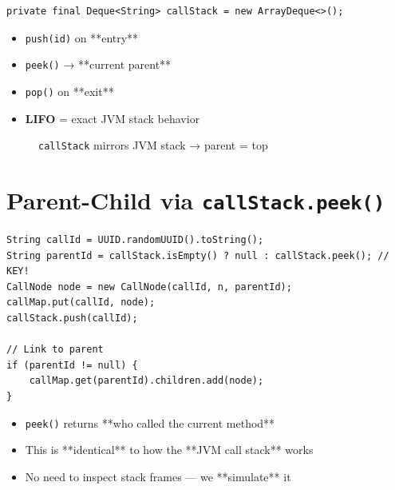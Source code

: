 \documentclass[11pt,a4paper]{article}
\begin{document}
    \begin{lstlisting}
private final Deque<String> callStack = new ArrayDeque<>();
    \end{lstlisting}

    \begin{itemize}
        \item \texttt{push(id)} on **entry**
        \item \texttt{peek()} → **current parent**
        \item \texttt{pop()} on **exit**
        \item \textbf{LIFO} = exact JVM stack behavior
    \end{itemize}

    \begin{figure}[H]
        \centering
        \caption{\texttt{callStack} mirrors JVM stack → parent = top}
        \label{fig:stack}
    \end{figure}

    \section{Parent-Child via \texttt{callStack.peek()}}

    \begin{lstlisting}[caption={On Method Entry}]
String callId = UUID.randomUUID().toString();
String parentId = callStack.isEmpty() ? null : callStack.peek(); // KEY!
CallNode node = new CallNode(callId, n, parentId);
callMap.put(callId, node);
callStack.push(callId);

// Link to parent
if (parentId != null) {
    callMap.get(parentId).children.add(node);
}
    \end{lstlisting}

    \begin{itemize}
        \item \texttt{peek()} returns **who called the current method**
        \item This is **identical** to how the **JVM call stack** works
        \item No need to inspect stack frames — we **simulate** it
    \end{itemize}
\end{document}
